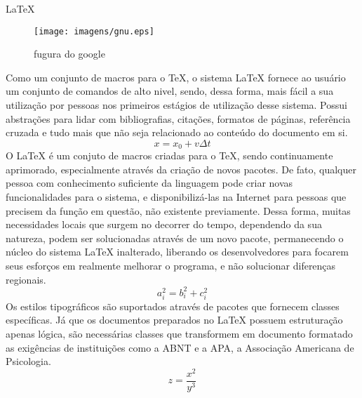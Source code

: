 \documentclass[twocolumn,10pt]{article}
\begin{document}
%
\LaTeX\
\begin{figure}[t]
  \centering
  \texttt{[image: imagens/gnu.eps]}
  \caption{fugura do google}
\end{figure}
%
Como um conjunto de macros para o TeX, o sistema LaTeX fornece ao usuário um conjunto de comandos de alto nivel, sendo, dessa forma, mais fácil a sua utilização por pessoas nos primeiros estágios de utilização desse sistema. Possui abstrações para lidar com bibliografias, citações, formatos de páginas, referência cruzada e tudo mais que não seja relacionado ao conteúdo do documento em si.
%
\begin{equation}
  x = x_0+v \Delta t
\end{equation}
%
O LaTeX é um conjuto de macros criadas para o TeX, sendo continuamente aprimorado, especialmente através da criação de novos pacotes. De fato, qualquer pessoa com conhecimento suficiente da linguagem pode criar novas funcionalidades para o sistema, e disponibilizá-las na Internet para pessoas que precisem da função em questão, não existente previamente. Dessa forma, muitas necessidades locais que surgem no decorrer do tempo, dependendo da sua natureza, podem ser solucionadas através de um novo pacote, permanecendo o núcleo do sistema LaTeX inalterado, liberando os desenvolvedores para focarem seus esforços em realmente melhorar o programa, e não solucionar diferenças regionais.
%
\begin{equation}
  \label{eq:pitagoras}
  a_i^2 = b_i^2 + c_i^2
\end{equation}
%
Os estilos tipográficos são suportados através de pacotes que fornecem classes específicas. Já que os documentos preparados no LaTeX possuem estruturação apenas lógica, são necessárias classes que transformem em documento formatado as exigências de instituições como a ABNT e a APA, a Associação Americana de Psicologia.
%
\begin{equation}
  \label{eq:bernoulli}
  z = \frac{x^2}{y^3}
\end{equation}
\end{document}
